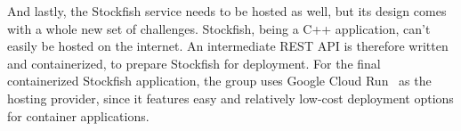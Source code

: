 And lastly, the Stockfish service needs to be hosted as well, but its design comes with a whole new set of challenges.
Stockfish, being a C++ application, can't easily be hosted on the internet.
An intermediate REST API is therefore written and containerized, to prepare Stockfish for deployment.
For the final containerized Stockfish application, the group uses Google Cloud Run~\cite{google-cloud-run} as the
hosting provider, since it features easy and relatively low-cost deployment options for container applications.
